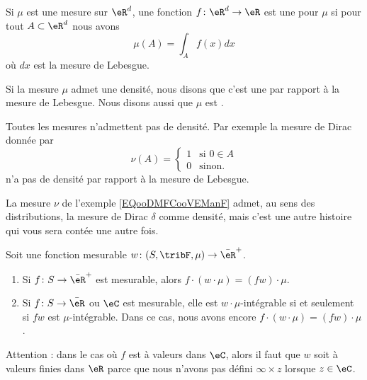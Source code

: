 \begin{definition}		\label{DEFooJNQYooKUcezo}
	Si \( \mu\) est une mesure sur \( \eR^d\), une fonction \( f\colon \eR^d\to \eR\) est une  pour \( \mu\) si pour tout \( A\subset\eR^d\) nous avons
	\begin{equation}
		\mu(A)=\int_Af(x)dx
	\end{equation}
	où \( dx\) est la mesure de Lebesgue.

	Si la mesure \( \mu\) admet une densité, nous disons que c'est une  par rapport à la mesure de Lebesgue. Nous disons aussi que \( \mu\) est .
\end{definition}

\begin{example}
	Toutes les mesures n'admettent pas de densité. Par exemple la mesure de Dirac donnée par
	\begin{equation}        \label{EQooDMFCooVEManF}
		\nu(A)=\begin{cases}
			1 & \text{si } 0\in A \\
			0 & \text{sinon. }
		\end{cases}
	\end{equation}
	n'a pas de densité par rapport à la mesure de Lebesgue.
\end{example}

La mesure \( \nu\) de l'exemple \ref{EQooDMFCooVEManF} admet, au sens des distributions, la mesure de Dirac \( \delta\) comme densité, mais c'est une autre histoire qui vous sera contée une autre fois.

\begin{proposition}  \label{PropooJMWAooDzfpmB}
	Soit une fonction mesurable \( w\colon (S,\tribF,\mu)\to \bar \eR^+\).
	\begin{enumerate}
		\item
		      Si \( f\colon S\to \bar\eR^+\) est mesurable, alors \( f\cdot(w\cdot \mu)=(fw)\cdot \mu\).
		\item
		      Si \( f\colon S\to \bar \eR\) ou \( \eC\) est mesurable, elle est \( w\cdot\mu\)-intégrable si et seulement si \( fw\) est \( \mu\)-intégrable. Dans ce cas, nous avons encore \( f\cdot(w\cdot \mu)=(fw)\cdot\mu\).
	\end{enumerate}
	Attention : dans le cas où \( f\) est à valeurs dans \( \eC\), alors il faut que \( w\) soit à valeurs finies dans \( \eR\) parce que nous n'avons pas défini \( \infty\times z\) lorsque \( z\in \eC\).
\end{proposition}

